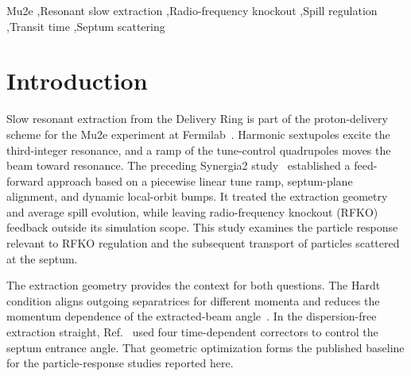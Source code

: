 \documentclass[a4paper,fleqn]{cas-sc}
\begin{document}
\begin{keywords}
Mu2e \sep Resonant slow extraction \sep Radio-frequency knockout \sep Spill regulation \sep Transit time \sep Septum scattering
\end{keywords}

\maketitle
{}

\ifdefined\SubmissionBuild\else
\setcounter{tocdepth}{10}
{\footnotesize\tableofcontents}

\clearpage
\fi
\doublespacing
\linenumbers


\section{\label{sec:intro}Introduction}

Slow resonant extraction from the Delivery Ring is part of the proton-delivery scheme for the Mu2e experiment at Fermilab~\cite{tdr}. Harmonic sextupoles excite the third-integer resonance, and a ramp of the tune-control quadrupoles moves the beam toward resonance. The preceding Synergia2 study~\cite{mu2e} established a feed-forward approach based on a piecewise linear tune ramp, septum-plane alignment, and dynamic local-orbit bumps. It treated the extraction geometry and average spill evolution, while leaving radio-frequency knockout (RFKO) feedback outside its simulation scope. This study examines the particle response relevant to RFKO regulation and the subsequent transport of particles scattered at the septum.

The extraction geometry provides the context for both questions. The Hardt condition aligns outgoing separatrices for different momenta and reduces the momentum dependence of the extracted-beam angle~\cite{hardt,pullia,pimms1,pimms2}. In the dispersion-free extraction straight, Ref.~\cite{mu2e} used four time-dependent correctors to control the septum entrance angle. That geometric optimization forms the published baseline for the particle-response studies reported here.
\end{document}
